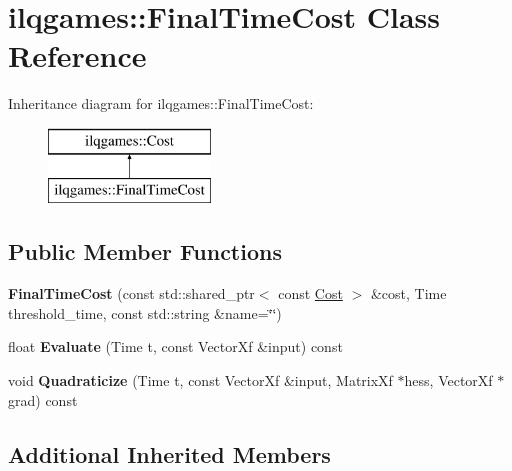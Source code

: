 \hypertarget{classilqgames_1_1_final_time_cost}{}\section{ilqgames\+:\+:Final\+Time\+Cost Class Reference}
\label{classilqgames_1_1_final_time_cost}
Inheritance diagram for ilqgames\+:\+:Final\+Time\+Cost\+:\begin{figure}[H]
\begin{center}
\leavevmode
\includegraphics[height=2.000000cm]{classilqgames_1_1_final_time_cost}
\end{center}
\end{figure}
\subsection*{Public Member Functions}
\begin{DoxyCompactItemize}
\item 
{\bfseries Final\+Time\+Cost} (const std\+::shared\+\_\+ptr$<$ const \hyperlink{classilqgames_1_1_cost}{Cost} $>$ \&cost, Time threshold\+\_\+time, const std\+::string \&name=\char`\"{}\char`\"{})\hypertarget{classilqgames_1_1_final_time_cost_a6990af0593d112126a7e327769bfff26}{}\label{classilqgames_1_1_final_time_cost_a6990af0593d112126a7e327769bfff26}

\item 
float {\bfseries Evaluate} (Time t, const Vector\+Xf \&input) const \hypertarget{classilqgames_1_1_final_time_cost_a69d2a9c213b4f25fbd653c6f62790523}{}\label{classilqgames_1_1_final_time_cost_a69d2a9c213b4f25fbd653c6f62790523}

\item 
void {\bfseries Quadraticize} (Time t, const Vector\+Xf \&input, Matrix\+Xf $\ast$hess, Vector\+Xf $\ast$grad) const \hypertarget{classilqgames_1_1_final_time_cost_ab1a60891be81b98096f1009b75d2e230}{}\label{classilqgames_1_1_final_time_cost_ab1a60891be81b98096f1009b75d2e230}

\end{DoxyCompactItemize}
\subsection*{Additional Inherited Members}


